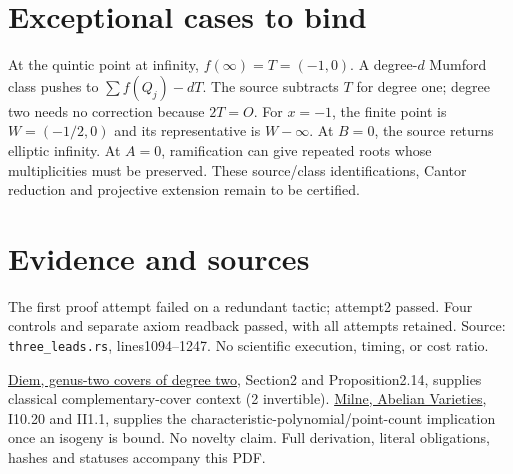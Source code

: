\documentclass[10pt]{article}
\begin{document}
\section*{Exceptional cases to bind}
At the quintic point at infinity, $f(\infty)=T=(-1,0)$. A degree-$d$ Mumford class pushes to $\sum f(Q_j)-dT$. The source subtracts $T$ for degree one; degree two needs no correction because $2T=O$. For $x=-1$, the finite point is $W=(-1/2,0)$ and its representative is $W-\infty$. At $B=0$, the source returns elliptic infinity. At $A=0$, ramification can give repeated roots whose multiplicities must be preserved. These source/class identifications, Cantor reduction and projective extension remain to be certified.
\section*{Evidence and sources}
The first proof attempt failed on a redundant tactic; attempt2 passed. Four controls and separate axiom readback passed, with all attempts retained. Source: \texttt{three\_leads.rs}, lines1094--1247. No scientific execution, timing, or cost ratio.

\href{https://arxiv.org/pdf/math/0312413}{Diem, genus-two covers of degree two}, Section2 and Proposition2.14, supplies classical complementary-cover context (2 invertible). \href{https://www.jmilne.org/math/CourseNotes/AV.pdf}{Milne, Abelian Varieties}, I10.20 and II1.1, supplies the characteristic-polynomial/point-count implication once an isogeny is bound. No novelty claim. Full derivation, literal obligations, hashes and statuses accompany this PDF.
\end{document}
